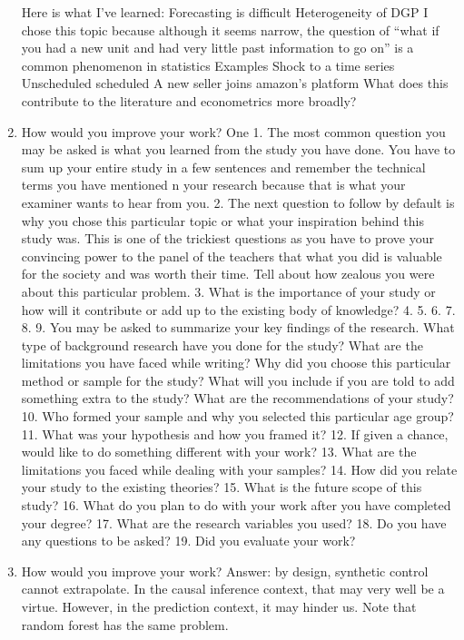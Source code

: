 \documentclass[9pt]{beamer}
\theoremstyle{definition}
\begin{document}
\begin{frame}
\begin{enumerate}
        Here is what I’ve learned:
        Forecasting is difficult
        Heterogeneity of DGP
        I chose this topic because although it seems narrow, the question of “what if you had a new unit and had very little past information to go on” is a common phenomenon in statistics
        Examples
        Shock to a time series
        Unscheduled
        scheduled
        A new seller joins amazon’s platform
        What does this contribute to the literature and econometrics more broadly?
        \item  How would you improve your work?  One 
        1. The most common question you may be asked is what you learned from the
study you have done. You have to sum up your entire study in a few sentences
and remember the technical terms you have mentioned n your research
because that is what your examiner wants to hear from you.
2. The next question to follow by default is why you chose this particular topic or
what your inspiration behind this study was. This is one of the trickiest
questions as you have to prove your convincing power to the panel of the
teachers that what you did is valuable for the society and was worth their time.
Tell about how zealous you were about this particular problem.
3. What is the importance of your study or how will it contribute or add up to the
existing body of knowledge?
4. 5. 6. 7. 8. 9. You may be asked to summarize your key findings of the research.
What type of background research have you done for the study?
What are the limitations you have faced while writing?
Why did you choose this particular method or sample for the study?
What will you include if you are told to add something extra to the study?
What are the recommendations of your study?
10. Who formed your sample and why you selected this particular age group?
11. What was your hypothesis and how you framed it?
12. If given a chance, would like to do something different with your work?
13. What are the limitations you faced while dealing with your samples?
14. How did you relate your study to the existing theories?
15. What is the future scope of this study?
16. What do you plan to do with your work after you have completed your
degree?
17. What are the research variables you used?
18. Do you have any questions to be asked?
19. Did you evaluate your work?
\item How would you improve your work?  Answer: by design, synthetic control cannot extrapolate.  In the causal inference context, that may very well be a virtue.  However, in the prediction context, it may hinder us.  Note that random forest has the same problem.
        
 
    \end{enumerate}
    \end{frame}
\end{document}
